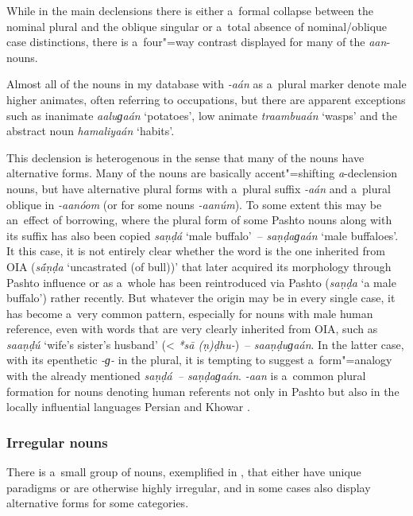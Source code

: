 While in the main declensions there is either a~formal collapse between the nominal plural and the oblique singular or a~total absence of nominal/oblique case distinctions, there is a~four"=way contrast displayed for many of the \textit{aan}-nouns.


Almost all of the nouns in my database with \textit{-aán} as a~plural marker denote male higher animates, often referring to occupations, but there are apparent exceptions such as inanimate \textit{aaluɡaán} `potatoes', low animate \textit{traambuaán} `wasps' and the abstract noun \textit{hamaliyaán} `habits'.


This declension is heterogenous in the sense that many of the nouns have alternative forms. Many of
the nouns are basically accent"=shifting \textit{a}-declension nouns, but have alternative plural
forms with a~plural suffix \textit{-aán} and a~plural oblique in
\textit{-aanóom} (or for some nouns \textit{-aanúm}). To some extent
this may be an~effect of borrowing, where the plural form of some Pashto nouns along with its suffix
has also been copied \textit{saṇḍá} `male buffalo'~-- \textit{saṇḍaɡaán} `male
buffaloes'. It this case, it is not entirely clear whether the word is the one inherited from OIA
(\textit{s\'{\={a}}ṇḍa} `uncastrated (of bull))' that later acquired its morphology through Pashto
influence or as a~whole has been reintroduced via Pashto (\textit{saṇḍa} `a male buffalo') rather
recently. But whatever the origin may be in every single case, it has become a~very common pattern,
especially for nouns with male human reference, even with words that are very clearly inherited from
OIA, such as \textit{saaṇḍú} `wife's sister's husband' ({\textless} \textit{*s\={a}\'{
  }(ṇ)ḍhu-})~-- \textit{saaṇḍuɡaán}. In the latter case, with its epenthetic
\textit{-ɡ-} in the plural, it is tempting to suggest a~form"=analogy with the already
mentioned \textit{saṇḍá~-- saṇḍaɡaán}. \textit{-aan} is a~common plural
formation for nouns denoting human referents not only in Pashto but also in the locally influential
languages Persian \citep[8]{lambton1953} and Khowar \citep[221--225]{endresenkristiansen1981}.

\subsubsection*{Irregular nouns}

There is a~small group of nouns, exemplified in , that either have unique paradigms or are otherwise highly irregular, and in some cases also display alternative forms for some categories. 

